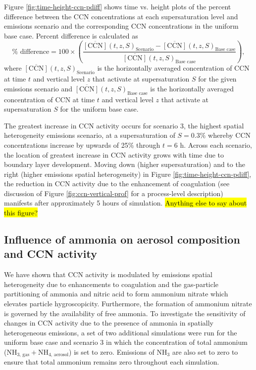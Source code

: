 \documentclass[journal abbreviation, manuscript]{copernicus}
\begin{document}
Figure \ref{fig:time-height-ccn-pdiff} shows time vs. height plots of the percent difference between the CCN concentrations at each supersaturation level and emissions scenario and the corresponding CCN concentrations in the uniform base case. Percent difference is calculated as 
\begin{equation}
    \% \text{ difference} = 100\times\left(\frac{\overline{[\text{CCN}]}(t, z, S)_{\text{Scenario}} - \overline{[\text{CCN}]}(t, z, S)_{\text{Base case}}}{\overline{[\text{CCN}]}(t, z, S)_{\text{Base case}}}\right),
\end{equation}
where $\overline{[\text{CCN}]}(t, z,S)_{\text{Scenario}}$ is the horizontally averaged concentration of CCN at time $t$ and vertical level $z$ that activate at supersaturation $S$ for the given emissions scenario and $\overline{[\text{CCN}]}(t, z, S)_{\text{Base case}}$ is the horizontally averaged concentration of CCN at time $t$ and vertical level $z$ that activate at supersaturation $S$ for the uniform base case. 

The greatest increase in CCN activity occurs for scenario 3, the highest spatial heterogeneity emissions scenario, at a supersaturation of $S=0.3\%$ whereby CCN concentrations increase by upwards of 25\% through $t=6$ h. Across each scenario, the location of greatest increase in CCN activity grows with time due to boundary layer development. Moving down (higher supersaturation) and to the right (higher emissions spatial heterogeneity) in Figure \ref{fig:time-height-ccn-pdiff}, the reduction in CCN activity due to the enhancement of coagulation (see discussion of Figure \ref{fig:ccn-vertical-prof} for a process-level description) manifests after approximately 5 hours of simulation. \hl{Anything else to say about this figure?}



\subsection{Influence of ammonia on aerosol composition and CCN activity}

We have shown that CCN activity is modulated by emissions spatial heterogeneity due to enhancements to coagulation and the gas-particle partitioning of ammonia and nitric acid to form ammonium nitrate which elevates particle hygroscopicity. Furthermore, the formation of ammonium nitrate is governed by the availability of free ammonia. To investigate the sensitivity of changes in CCN activity due to the presence of ammonia in spatially heterogeneous emissions, a set of two additional simulations were run for the uniform base case and scenario 3 in which the concentration of total ammonium (NH$_{3\text{, gas}} + $NH$_{4\text{, aerosol}}$) is set to zero. Emissions of NH$_3$ are also set to zero to ensure that total ammonium remains zero throughout each simulation. 
\end{document}

